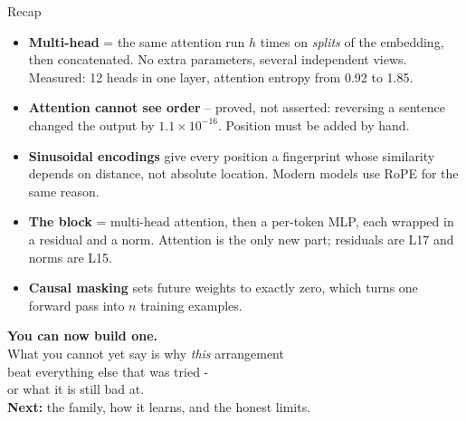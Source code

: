 \documentclass[aspectratio=169]{beamer}
\begin{document}
\begin{frame}{Recap}
  \vskip 4pt
  \small
  \begin{itemize}
    \item \textbf{Multi-head} = the same attention run $h$ times on \emph{splits} of the
      embedding, then concatenated. No extra parameters, several independent views. Measured:
      12 heads in one layer, attention entropy from 0.92 to 1.85.
    \item \textbf{Attention cannot see order} -- proved, not asserted: reversing a sentence
      changed the output by $1.1\times10^{-16}$. Position must be added by hand.
    \item \textbf{Sinusoidal encodings} give every position a fingerprint whose similarity
      depends on distance, not absolute location. Modern models use RoPE for the same reason.
    \item \textbf{The block} = multi-head attention, then a per-token MLP, each wrapped in a
      residual and a norm. Attention is the only new part; residuals are L17 and norms are L15.
    \item \textbf{Causal masking} sets future weights to exactly zero, which turns one forward
      pass into $n$ training examples.
  \end{itemize}
\end{frame}

\begin{frame}[plain]
  \vfill
  \begin{center}
    {\Large\bfseries\color{popblue} You can now build one.}\\[0.9em]
    {\large What you cannot yet say is why \emph{this} arrangement}\\[0.25em]
    {\large beat everything else that was tried -}\\[0.25em]
    {\large or what it is still bad at.}\\[1.3em]
    {\large\color{paramgreen}\textbf{Next:} the family, how it learns, and the honest limits.}
  \end{center}
  \vfill
\end{frame}
\end{document}
